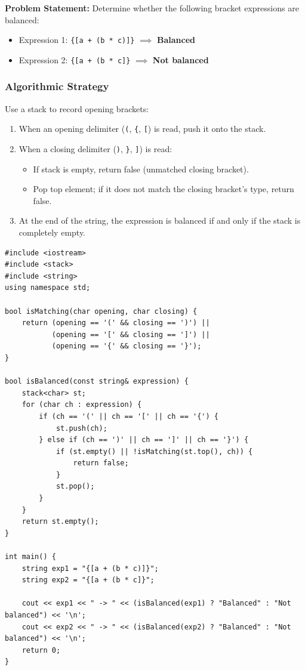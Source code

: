 \textbf{Problem Statement:} Determine whether the following bracket expressions are balanced:
\begin{itemize}
    \item Expression 1: \texttt{\{[a + (b * c)]\}} $\implies$ \textbf{Balanced}
    \item Expression 2: \texttt{\{[a + (b * c]\}} $\implies$ \textbf{Not balanced}
\end{itemize}

\subsubsection*{Algorithmic Strategy}
Use a stack to record opening brackets:
\begin{enumerate}
    \item When an opening delimiter (\texttt{(}, \texttt{\{}, \texttt{[}) is read, push it onto the stack.
    \item When a closing delimiter (\texttt{)}, \texttt{\}}, \texttt{]}) is read:
    \begin{itemize}
        \item If stack is empty, return false (unmatched closing bracket).
        \item Pop top element; if it does not match the closing bracket's type, return false.
    \end{itemize}
    \item At the end of the string, the expression is balanced if and only if the stack is completely empty.
\end{enumerate}

\begin{lstlisting}[style=cppstyle, caption={C++ Solution for Balanced Parentheses.}]
#include <iostream>
#include <stack>
#include <string>
using namespace std;

bool isMatching(char opening, char closing) {
    return (opening == '(' && closing == ')') ||
           (opening == '[' && closing == ']') ||
           (opening == '{' && closing == '}');
}

bool isBalanced(const string& expression) {
    stack<char> st;
    for (char ch : expression) {
        if (ch == '(' || ch == '[' || ch == '{') {
            st.push(ch);
        } else if (ch == ')' || ch == ']' || ch == '}') {
            if (st.empty() || !isMatching(st.top(), ch)) {
                return false;
            }
            st.pop();
        }
    }
    return st.empty();
}

int main() {
    string exp1 = "{[a + (b * c)]}";
    string exp2 = "{[a + (b * c]}";

    cout << exp1 << " -> " << (isBalanced(exp1) ? "Balanced" : "Not balanced") << '\n';
    cout << exp2 << " -> " << (isBalanced(exp2) ? "Balanced" : "Not balanced") << '\n';
    return 0;
}
\end{lstlisting}

